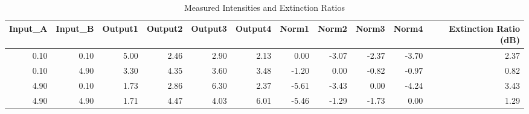 \begin{table}
\caption{Measured Intensities and Extinction Ratios}
\label{tab:extinction_ratios}
\begin{tabular}{rrrrrrrrrrr}
\toprule
Input_A & Input_B & Output1 & Output2 & Output3 & Output4 & Norm1 & Norm2 & Norm3 & Norm4 & Extinction Ratio (dB) \\
\midrule
0.10 & 0.10 & 5.00 & 2.46 & 2.90 & 2.13 & 0.00 & -3.07 & -2.37 & -3.70 & 2.37 \\
0.10 & 4.90 & 3.30 & 4.35 & 3.60 & 3.48 & -1.20 & 0.00 & -0.82 & -0.97 & 0.82 \\
4.90 & 0.10 & 1.73 & 2.86 & 6.30 & 2.37 & -5.61 & -3.43 & 0.00 & -4.24 & 3.43 \\
4.90 & 4.90 & 1.71 & 4.47 & 4.03 & 6.01 & -5.46 & -1.29 & -1.73 & 0.00 & 1.29 \\
\bottomrule
\end{tabular}
\end{table}
